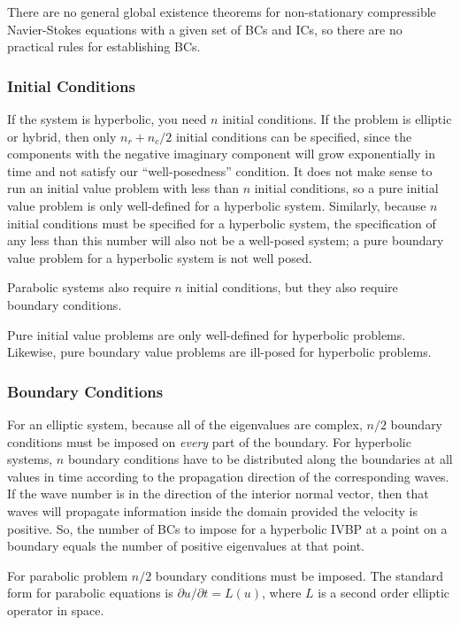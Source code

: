 \documentclass[10pt]{article}
\begin{document}
\begin{flushleft}
There are no general global existence theorems for non-stationary compressible Navier-Stokes equations with a given set of BCs and ICs, so there are no practical rules for establishing BCs.

\subsubsection{Initial Conditions}
If the system is hyperbolic, you need \(n\) initial conditions. If the problem is elliptic or hybrid, then only \(n_r+n_c/2\) initial conditions can be specified, since the components with the negative imaginary component will grow exponentially in time and not satisfy our ``well-posedness'' condition. It does not make sense to run an initial value problem with less than \(n\) initial conditions, so a pure initial value problem is only well-defined for a hyperbolic system. Similarly, because \(n\) initial conditions must be specified for a hyperbolic system, the specification of any less than this number will also not be a well-posed system; a pure boundary value problem for a hyperbolic system is not well posed.

Parabolic systems also require \(n\) initial conditions, but they also require boundary conditions.

Pure initial value problems are only well-defined for hyperbolic problems. Likewise, pure boundary value problems are ill-posed for hyperbolic problems.


\subsubsection{Boundary Conditions}
For an elliptic system, because all of the eigenvalues are complex, \(n/2\) boundary conditions must be imposed on {\it every} part of the boundary. For hyperbolic systems, \(n\) boundary conditions have to be distributed along the boundaries at all values in time according to the propagation direction of the corresponding waves. If the wave number is in the direction of the interior normal vector, then that waves will propagate information inside the domain provided the velocity is positive. So, the number of BCs to impose for a hyperbolic IVBP at a point on a boundary equals the number of positive eigenvalues at that point.

For parabolic problem \(n/2\) boundary conditions must be imposed. The standard form for parabolic equations is \(\partial u/\partial t=L(u)\), where \(L\) is a second order elliptic operator in space.


\end{flushleft}
\end{document}
